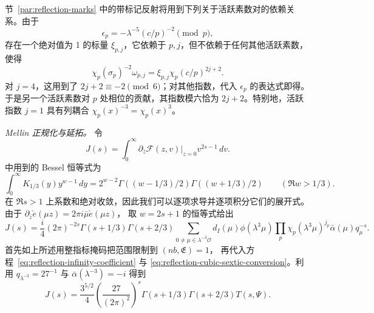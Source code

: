 节~\ref{par:reflection-marks} 中的带标记反射将用到下列关于活跃素数对的依赖关系。由于
\[
 \epsilon_p=-\lambda^{-5}(c/p)^{-2}\pmod p,
\]
存在一个绝对值为 1 的标量 $\xi_{p,j}$，它依赖于 $p,j$，但不依赖于任何其他活跃素数，使得
\begin{equation}\label{eq:reflection-cross-prime-phase}
 \chi_p(\sigma_p)^{-2}\omega_{p,j}
       =\xi_{p,j}\chi_p(c/p)^{2j+2}.
\end{equation}
对 $j=4$，这用到了 $2j+2\equiv-2\pmod6$；对其他指数，代入 $\epsilon_p$ 的表达式即得。
于是另一个活跃素数对 $p$ 处相位的贡献，其指数模六恰为 $2j+2$。特别地，活跃指数
$j=1$ 具有列耦合 $\chi_p(x)^{-3}=\chi_p(x)^3$。

\emph{Mellin 正规化与延拓。}
令
\[
 J(s)=\int_0^\infty
       \left.\partial_{\bar z}\mathcal F(z,v)\right|_{z=0}
       v^{2s-1}\,dv.
\]
\cite[引理~5.3]{DR} 中用到的 Bessel 恒等式为
\[
 \int_0^\infty K_{1/3}(y)y^{w-1}\,dy
  =2^{w-2}\Gamma((w-1/3)/2)\Gamma((w+1/3)/2)
       \qquad(\Re w>1/3).
\]
在 $\Re s>1$ 上系数和绝对收敛，因此我们可以逐项求导并逐项积分它们的展开式。
由于 $\partial_{\bar z}\check e(\mu z)=2\pi i\bar\mu\check e(\mu z)$，
取 $w=2s+1$ 的恒等式给出
\[
 J(s)=\frac i4(2\pi)^{-2s}\Gamma(s+1/3)\Gamma(s+2/3)
       \sum_{0\ne\mu\in\lambda^{-3}\mathcal O}d_I(\mu)\phi(\lambda^3\mu)
          \prod_p\chi_p(\lambda^3\mu)^{j_p}
          \bar\alpha(\mu)q_\mu^{-s}.
\]
首先如上所述用整指标掩码把范围限制到 $(nb,\mathfrak E)=1$，
再代入方程~\eqref{eq:reflection-infinity-coefficient} 与
\eqref{eq:reflection-cubic-sextic-conversion}。利用
$q_{\lambda^{-3}}=27^{-1}$ 与 $\bar\alpha(\lambda^{-3})=-i$ 得到
\begin{equation}\label{eq:reflection-direct-mellin}
 J(s)=\frac{3^{5/2}}4\left(\frac{27}{(2\pi)^2}\right)^s
       \Gamma(s+1/3)\Gamma(s+2/3)T(s,\Psi).
\end{equation}

